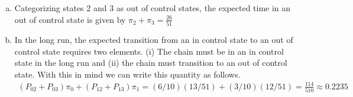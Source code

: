 \documentclass[12pt]{article}  %
\begin{document}
\begin{description}
\begin{enumerate}[(a)]
\item Categorizing states 2 and 3 as out of control states, the expected time in an out of control state is given by $\pi_2 + \pi_3 = \frac{26}{51}$
\item In the long run, the expected transition from an in control state to an out of control state requires two elements. (i) The chain must be in an in control state in the long run and (ii) the chain must transition to an out of control state. With this in mind we can write this quantity as follows. 
\begin{align*}
(P_{02} + P_{03})\pi_{0} + (P_{12} + P_{13})\pi_{1} = (6/10)(13/51) + (3/10)(12/51) = \frac{114}{510}\approx 0.2235
\end{align*}
\end{enumerate}
\end{description}	
\end{document}
